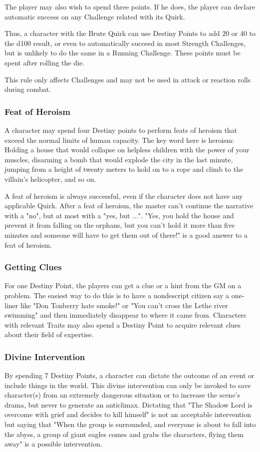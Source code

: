 \begin{multicols}{2}
The player may also wish to spend three
points. If he does, the player can declare automatic
success on any Challenge related with its Quirk.

Thus, a character with the Brute Quirk can
use Destiny Points to add 20 or 40 to the d100
result, or even to automatically succeed in most
Strength Challenges, but is unlikely to do the same
in a Running Challenge. These points must be
spent after rolling the die.

This rule only affects Challenges and may
not be used in attack or reaction rolls during
combat.

\subsubsection{Feat of Heroism}
A character may spend four Destiny points
to perform feats of heroism that exceed the normal
limits of human capacity. The key word here is
heroism: Holding a house that would collapse on
helpless children with the power of your muscles,
disarming a bomb that would explode the city in
the last minute, jumping from a height of twenty
meters to hold on to a rope and climb to the
villain’s helicopter, and so on.

A feat of heroism is always successful, even
if the character does not have any applicable Quirk.
After a feat of heroism, the master can’t continue
the narrative with a "no", but at most with a "yes,
but ...". "Yes, you hold the house and prevent it from
falling on the orphans, but you can’t hold it more
than five minutes and someone will have to get
them out of there!" is a good answer to a feat of
heroism.

\subsubsection{Getting Clues}
For one Destiny Point, the players can get a
clue or a hint from the GM on a problem. The
easiest way to do this is to have a nondescript
citizen say a one-liner like "Don Tonberry hate
smoke!" or "You can’t cross the Lethe river
swimming" and then immediately disappear to
where it came from. Characters with relevant
Traits may also spend a Destiny Point to acquire
relevant clues about their field of expertise.

\subsubsection{Divine Intervention}
By spending 7 Destiny Points, a character
can dictate the outcome of an event or include
things in the world. This divine intervention can
only be invoked to save character(s) from an
extremely dangerous situation or to increase the
scene’s drama, but never to generate an anticlimax.
Dictating that "The Shadow Lord is
overcome with grief and decides to kill himself" is
not an acceptable intervention but saying that
"When the group is surrounded, and everyone is
about to fall into the abyss, a group of giant eagles
comes and grabs the characters, flying them away"
is a possible intervention.


\end{multicols}
